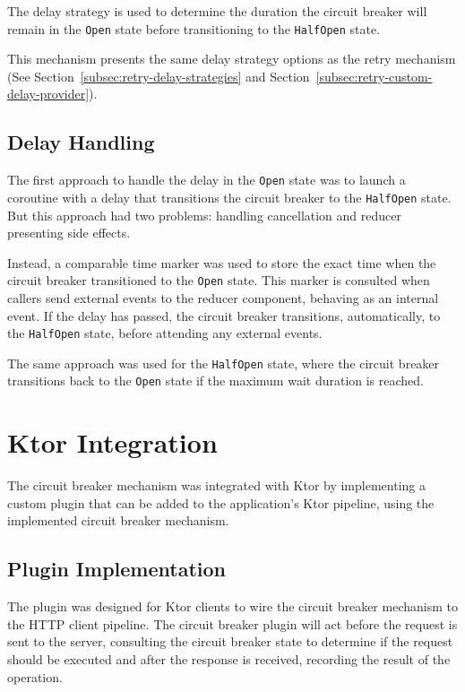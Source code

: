 The delay strategy is used
to determine the duration the circuit breaker will remain in the \texttt{Open} state before transitioning to the \texttt{HalfOpen} state.

This mechanism presents the same delay strategy options as the retry mechanism (See Section~\ref{subsec:retry-delay-strategies} and Section~\ref{subsec:retry-custom-delay-provider}).

\subsection{Delay Handling}\label{subsec:cbreaker-delay-handling}

The first approach to handle the delay in the \texttt{Open} state was
to launch a coroutine with a delay that transitions the circuit breaker to the \texttt{HalfOpen} state.
But this approach had two problems: handling cancellation and reducer presenting side effects.

Instead,
a comparable time marker was used to store the exact time when the circuit breaker transitioned to the \texttt{Open} state.
This marker is consulted when callers send external events to the reducer component,
behaving as an internal event.
If the delay has passed, the circuit breaker transitions, automatically, to the \texttt{HalfOpen} state,
before attending any external events.

The same approach was used for the \texttt{HalfOpen} state, where the circuit breaker transitions back to the \texttt{Open} state if the maximum wait duration is reached.

\section{Ktor Integration}\label{sec:cbreaker-ktor-integration}

The circuit breaker mechanism was integrated with Ktor by implementing a custom plugin that can be added to the application's Ktor pipeline, using the implemented circuit breaker mechanism.

\subsection{Plugin Implementation}\label{subsec:circuit-breaker-plugin}

The plugin was designed for Ktor clients to wire the circuit breaker mechanism to the HTTP client pipeline.
The circuit breaker plugin will act before the request is sent to the server,
consulting the circuit breaker state to determine if the request should be executed and after the response is received,
recording the result of the operation.

